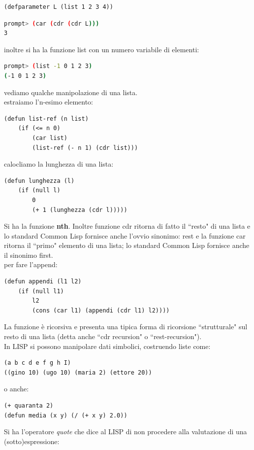 \documentclass[a4paper,12pt, oneside]{book}
\begin{document}
\begin{verbatim}
(defparameter L (list 1 2 3 4))
\end{verbatim}
\begin{shaded}
\begin{lstlisting}[language=bash]
prompt> (car (cdr (cdr L)))
3
\end{lstlisting}
\end{shaded}
inoltre si ha la funzione list con un numero variabile di elementi:
\begin{shaded}
\begin{lstlisting}[language=bash]
prompt> (list -1 0 1 2 3)
(-1 0 1 2 3)
\end{lstlisting}
\end{shaded}
vediamo qualche manipolazione di una lista.\\
estraiamo l'n-esimo elemento:
\begin{verbatim}
(defun list-ref (n list)
    (if (<= n 0)
        (car list)
        (list-ref (- n 1) (cdr list)))
\end{verbatim}
calocliamo la lunghezza di una lista:
\begin{verbatim}
(defun lunghezza (l)
    (if (null l)
        0
        (+ 1 (lunghezza (cdr l)))))
\end{verbatim}
Si ha la funzione \textbf{nth}. Inoltre funzione cdr ritorna di fatto il “resto" di una lista e lo standard
Common Lisp fornisce anche l’ovvio sinonimo: rest e la funzione car ritorna il “primo" elemento di una lista; lo standard
Common Lisp fornisce anche il sinonimo first.\\
per fare l'append:
\begin{verbatim}
(defun appendi (l1 l2)
    (if (null l1)
        l2
        (cons (car l1) (appendi (cdr l1) l2))))
\end{verbatim}
La funzione è ricorsiva e presenta una tipica forma di ricorsione “strutturale" sul resto di una lista (detta anche “cdr recursion" o “rest-recursion").\\
In LISP si possono manipolare dati simbolici, costruendo liste come:
\begin{verbatim}
(a b c d e f g h I)
((gino 10) (ugo 10) (maria 2) (ettore 20))
\end{verbatim}
o anche:
\begin{verbatim}
(+ quaranta 2)
(defun media (x y) (/ (+ x y) 2.0))
\end{verbatim}
Si ha l'operatore \textit{quote} che dice al LISP di non procedere alla valutazione di una (sotto)espressione:
\end{document}
